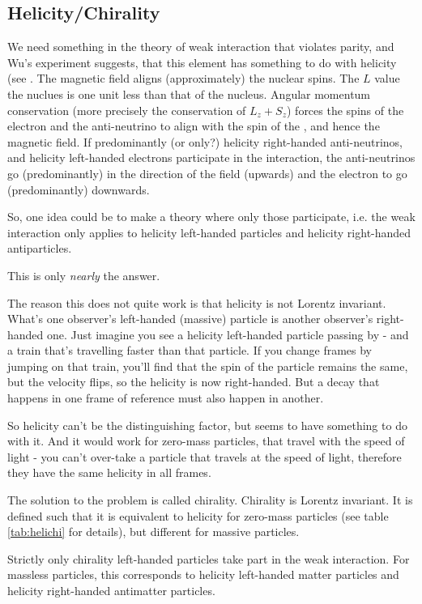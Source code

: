 \subsection{Helicity/Chirality}
 We need something in the theory of weak interaction that violates
 parity, and Wu's experiment suggests, that this element has something
 to do with helicity (see . The magnetic field aligns (approximately) the nuclear spins. The $L$ value the  nuclues is one unit less than that of the  nucleus. Angular momentum conservation (more precisely the conservation of $L_z + S_z$) forces the spins of the electron and the anti-neutrino to align with the spin of the , and hence the magnetic field.
 If predominantly (or only?) helicity
 right-handed anti-neutrinos, and helicity left-handed electrons participate in the interaction, the anti-neutrinos go (predominantly) in the direction of the field (upwards) and the electron to go (predominantly) downwards.
 
 So, one idea could be to make
 a theory where only those participate, i.e. the weak interaction only
 applies to helicity left-handed particles and helicity right-handed
 antiparticles.

 This is only \emph{nearly} the answer.

 The reason this does not quite work is that helicity is not Lorentz
 invariant. What's one observer's left-handed (massive) particle is
 another observer's right-handed one. Just imagine you see a helicity
 left-handed particle passing by - and a train that's travelling faster
 than that particle. If you change frames by jumping on that train,
 you'll find that the spin of the particle remains the same, but the
 velocity flips, so the helicity is now right-handed.  But a decay
 that happens in one frame of reference must also happen in
 another.

 So helicity can't be the distinguishing factor, but seems to have
 something to do with it. And it would work for zero-mass particles,
 that travel with the speed of light - you can't over-take a particle
 that travels at the speed of light, therefore they have the same
 helicity in all frames.

 The solution to the problem is called chirality. Chirality is Lorentz
 invariant. It is defined such that it is equivalent to helicity for
 zero-mass particles (see table \ref{tab:helichi} for details), but
 different for massive particles.

 Strictly only chirality left-handed particles take part in the weak
 interaction. For massless particles, this corresponds to helicity
 left-handed matter particles and helicity right-handed antimatter
 particles.

